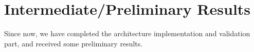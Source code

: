 \section{Intermediate/Preliminary Results}
\label{sec:results}
Since now, we have completed the architecture implementation and validation part, and received some preliminary results.\\
